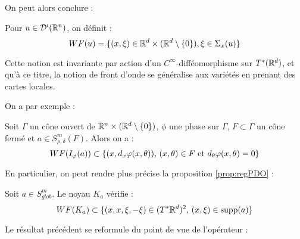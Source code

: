 On peut alors conclure :

\begin{defn}
	Pour $u \in \mathcal{D'}(\mathbb{R}^n)$, on définit :
	\begin{equation*}
	WF(u)=\{(x,\xi)\in \mathbb{R}^d\times(\mathbb{R}^d\setminus \{0\}), \xi \in \Sigma_x(u)\}
	\end{equation*}
\end{defn}
Cette notion est invariante par action d'un $C^{\infty}$-difféomorphisme sur $T^*(\mathbb{R}^d)$, et qu'à ce titre, la notion de front d'onde se généralise aux variétés en prenant des cartes locales.

On a par exemple :

\begin{prop}
	Soit $\Gamma$ un cône ouvert de $\mathbb{R}^n \times (\mathbb{R}^d \setminus \{0\})$, $\phi$ une phase sur $\Gamma$, $F\subset \Gamma$ un cône fermé et $a \in S^m_{\rho,\delta}(F)$. Alors on a :
	\begin{equation*}
		WF(I_{\varphi}(a))\subset \{(x,d_x\varphi(x,\theta)),\,(x,\theta)\in F \text{ et }d_{\theta}\varphi(x,\theta)=0\}
	\end{equation*}
\end{prop}

En particulier, on peut rendre plus précise la proposition \ref{prop:regPDO} :
\begin{corr}
	Soit $a \in S^m_{glob}$. Le noyau $K_a$ vérifie :
	\begin{equation*}
		WF(K_a)\subset \{(x,x,\xi,-\xi)\in (T^*\mathbb{R}^d)^2,\,(x,\xi)\in \operatorname{supp} (a)\}
	\end{equation*}
\end{corr}

Le résultat précédent se reformule du point de vue de l'opérateur :

